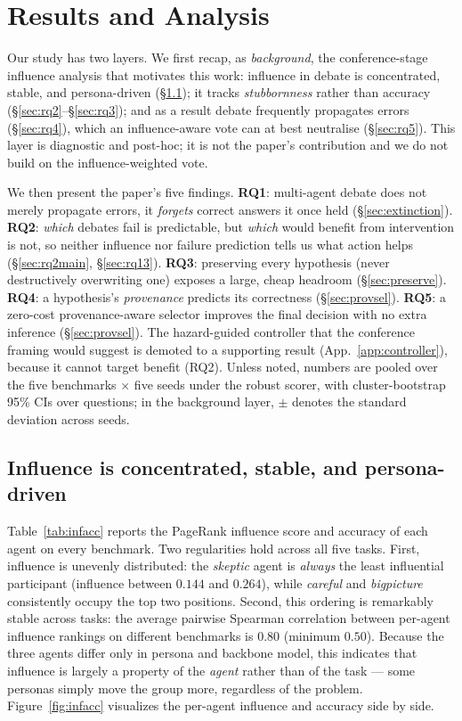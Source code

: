 \section{Results and Analysis}
\label{sec:results}

Our study has two layers. We first recap, as \emph{background}, the conference-stage influence
analysis that motivates this work: influence in debate is concentrated, stable, and persona-driven
(\S\ref{sec:rq1}); it tracks \emph{stubbornness} rather than accuracy
(\S\ref{sec:rq2}--\S\ref{sec:rq3}); and as a result debate frequently propagates errors
(\S\ref{sec:rq4}), which an influence-aware vote can at best neutralise (\S\ref{sec:rq5}). This layer
is diagnostic and post-hoc; it is not the paper's contribution and we do not build on the
influence-weighted vote.

We then present the paper's five findings. \textbf{RQ1}: multi-agent debate does not merely propagate
errors, it \emph{forgets} correct answers it once held (\S\ref{sec:extinction}). \textbf{RQ2}:
\emph{which} debates fail is predictable, but \emph{which} would benefit from intervention is not, so
neither influence nor failure prediction tells us what action helps (\S\ref{sec:rq2main},
\S\ref{sec:rq13}). \textbf{RQ3}: preserving every hypothesis (never destructively overwriting one)
exposes a large, cheap headroom (\S\ref{sec:preserve}). \textbf{RQ4}: a hypothesis's \emph{provenance}
predicts its correctness (\S\ref{sec:provsel}). \textbf{RQ5}: a zero-cost provenance-aware selector
improves the final decision with no extra inference (\S\ref{sec:provsel}). The hazard-guided
controller that the conference framing would suggest is demoted to a supporting result
(App.~\ref{app:controller}), because it cannot target benefit (RQ2). Unless noted, numbers are pooled
over the five benchmarks $\times$ five seeds under the robust scorer, with cluster-bootstrap 95\% CIs
over questions; in the background layer, $\pm$ denotes the standard deviation across seeds.

\subsection{Influence is concentrated, stable, and persona-driven}
\label{sec:rq1}

Table~\ref{tab:infacc} reports the PageRank influence score and accuracy of each
agent on every benchmark. Two regularities hold across all five tasks. First,
influence is unevenly distributed: the \textit{skeptic} agent is \emph{always} the
least influential participant (influence between $0.144$ and $0.264$), while
\textit{careful} and \textit{bigpicture} consistently occupy the top two positions.
Second, this ordering is remarkably stable across tasks: the average pairwise
Spearman correlation between per-agent influence rankings on different benchmarks is
$0.80$ (minimum $0.50$). Because the three agents differ only in persona and
backbone model, this indicates that influence is largely a property of the
\emph{agent} rather than of the task --- some personas simply move the group more,
regardless of the problem. Figure~\ref{fig:infacc} visualizes the per-agent
influence and accuracy side by side.

